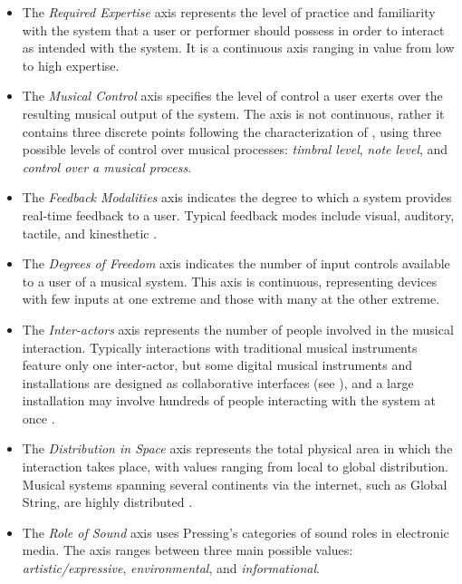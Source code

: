 {{\begin{itemize}
	\item The \emph{Required Expertise} axis represents the level of practice and familiarity with the system that a user or performer should possess in order to interact as intended with the system. It is a continuous axis ranging in value from low to high expertise.
	\item The \emph{Musical Control} axis specifies the level of control a user exerts over the resulting musical output of the system. The axis is not continuous, rather it contains three discrete points following the characterization of \cite{Schloss:1990}, using three possible levels of control over musical processes: \emph{timbral level}, \emph{note level}, and \emph{control over a musical process}.
	\item The \emph{Feedback Modalities} axis indicates the degree to which a system provides real-time feedback to a user. Typical feedback modes include visual, auditory, tactile, and kinesthetic \cite{Wanderley:2000}.
	\item The \emph{Degrees of Freedom} axis indicates the number of input controls available to a user of a musical system. This axis is continuous, representing devices with few inputs at one extreme and those with many at the other extreme.
	\item The \emph{Inter-actors} axis represents the number of people involved in the musical interaction. Typically interactions with traditional musical instruments feature only one inter-actor, but some digital musical instruments and installations are designed as collaborative interfaces (see \cite{Fels:2002a,Blaine:2003a}), and a large installation may involve hundreds of people interacting with the system at once \cite{Ulyate:2001}.
	\item The \emph{Distribution in Space} axis represents the total physical area in which the interaction takes place, with values ranging from local to global distribution. Musical systems spanning several continents via the internet, such as Global String, are highly distributed \cite{Tanaka:2001a}.
	\item The \emph{Role of Sound} axis uses Pressing's \cite{Pressing:1997} categories of sound roles in electronic media. The axis ranges between three main possible values: \emph{artistic/expressive}, \emph{environmental}, and \emph{informational}.
\end{itemize}

}}
